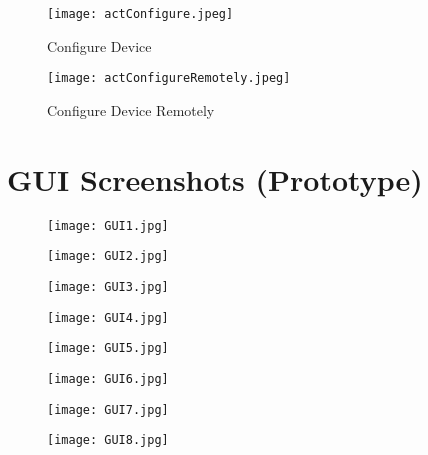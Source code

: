 \documentclass{scrreprt}
\begin{document}
\begin{figure}[h!]
    \centering
    \texttt{[image: actConfigure.jpeg]}
    \caption{Configure Device}
    \label{fig:configure}
\end{figure}

\begin{figure}[h!]
    \centering
    \texttt{[image: actConfigureRemotely.jpeg]}
    \caption{Configure Device Remotely}
    \label{fig:remotely}
\end{figure}

\clearpage
\section{GUI Screenshots (Prototype)}
\begin{figure}[h!]
    \centering
    \texttt{[image: GUI1.jpg]}
    \label{fig:gui1}
\end{figure}

\begin{figure}[h!]
    \centering
    \texttt{[image: GUI2.jpg]}
    \label{fig:gui2}
\end{figure}

\begin{figure}[h!]
    \centering
    \texttt{[image: GUI3.jpg]}
    \label{fig:gui3}
\end{figure}

\begin{figure}[h!]
    \centering
    \texttt{[image: GUI4.jpg]}
    \label{fig:gui4}
\end{figure}

\begin{figure}[h!]
    \centering
    \texttt{[image: GUI5.jpg]}
    \label{fig:gui5}
\end{figure}

\begin{figure}[h!]
    \centering
    \texttt{[image: GUI6.jpg]}
    \label{fig:gui6}
\end{figure}

\begin{figure}[h!]
    \centering
    \texttt{[image: GUI7.jpg]}
    \label{fig:gui7}
\end{figure}

\begin{figure}[h!]
    \centering
    \texttt{[image: GUI8.jpg]}
    \label{fig:gui8}
\end{figure}
\end{document}
